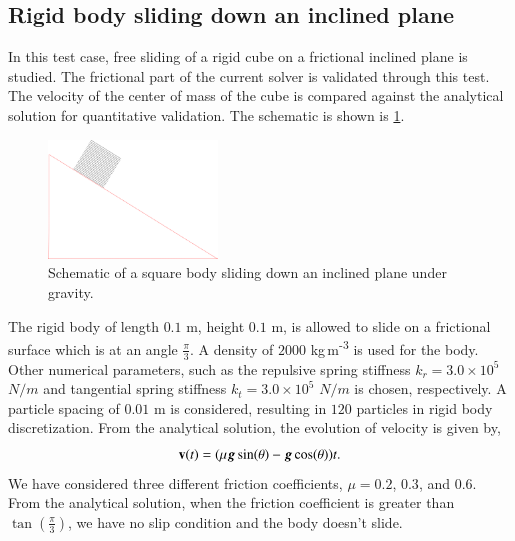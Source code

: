 \subsection{Rigid body sliding down an inclined plane}
\label{sec:rigid-body-sliding}
In this test case, free sliding of a rigid cube on a frictional inclined plane
is studied. The frictional part of the current solver is validated through this
test. The velocity of the center of mass of the cube is compared against the
analytical solution for quantitative validation. The schematic is shown is
\cref{fig:rigid_body_sliding}.
\begin{figure}[!htpb]
  \centering
  \includegraphics[width=0.4\textwidth]{images/rfc/images/rigid_body_sliding/schematic}
  \caption{Schematic of a square body sliding down an inclined plane under gravity.}
\label{fig:rigid_body_sliding}
\end{figure}
The rigid body of length $0.1$ m, height $0.1$ m, is allowed to slide on a
frictional surface which is at an angle $\frac{\pi}{3}$. A density of $2000$
kg\,m\textsuperscript{-3} is used for the body. Other numerical parameters, such
as the repulsive spring stiffness $k_r=3.0 \times 10^{5}$ $N/m$ and tangential
spring stiffness $k_t=3.0 \times 10^{5}$ $N/m$ is chosen, respectively. A
particle spacing of $0.01$ m is considered, resulting in $120$ particles in
rigid body discretization. From the analytical solution, the evolution of
velocity is given by,
\begin{equation}
  \label{eq:rfc:ce}
  \mathbf{v}(t) = (\mu \boldsymbol{g} \sin (\theta) - \boldsymbol{g} \cos (\theta)) t.
\end{equation}
We have considered three different friction coefficients, $\mu=0.2$,
$0.3$, and $0.6$. From the analytical solution, when the friction
coefficient is greater than $\tan(\frac{\pi}{3})$, we have no slip condition
and the body doesn't slide.


